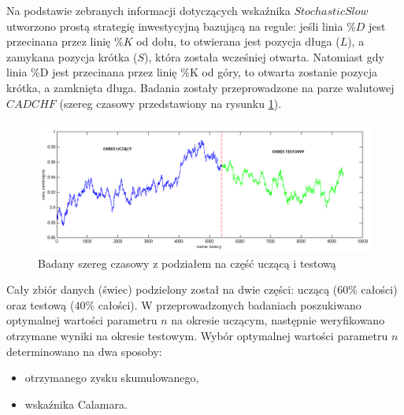 \documentclass[12pt,a4paper]{article}
\begin{document}
Na podstawie zebranych informacji dotyczących wskaźnika $Stochastic Slow$ utworzono prostą strategię inwestycyjną bazującą na regule: jeśli linia $\%D$ jest przecinana przez  linię $\%K$ od dołu, to otwierana jest pozycja długa ($L$), a zamykana pozycja krótka ($S$), która została wcześniej otwarta. Natomiast gdy linia \%D jest przecinana przez linię \%K od góry, to otwarta zostanie pozycja krótka, a zamknięta długa. Badania zostały przeprowadzone na parze walutowej $CADCHF$ (szereg czasowy przedstawiony na rysunku \ref{rys2}). \\
\begin{figure}[h!]
\centering
\includegraphics[width = \textwidth]{szereg.png}
\caption{Badany szereg czasowy z podziałem na część uczącą i testową}
\label{rys2}
\end{figure}
\FloatBarrier
Cały zbiór danych (świec) podzielony został na dwie części: uczącą ($60\%$ całości) oraz testową ($40\%$ całości). W przeprowadzonych badaniach poszukiwano optymalnej wartości parametru $n$ na okresie uczącym, następnie weryfikowano otrzymane wyniki na okresie testowym. Wybór optymalnej wartości parametru $n$ determinowano na dwa sposoby:
\begin{itemize}
\item otrzymanego zysku skumulowanego,
\item wskaźnika Calamara.
\end{itemize}
\end{document}
